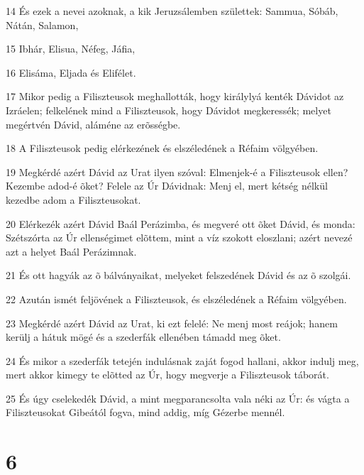 \par 14 És ezek a nevei azoknak, a kik Jeruzsálemben születtek: Sammua, Sóbáb, Nátán, Salamon,
\par 15 Ibhár, Elisua, Néfeg, Jáfia,
\par 16 Elisáma, Eljada és Elifélet.
\par 17 Mikor pedig a Filiszteusok meghallották, hogy királylyá kenték Dávidot az Izráelen; felkelének mind a Filiszteusok, hogy Dávidot megkeressék; melyet megértvén Dávid, aláméne az erõsségbe.
\par 18 A Filiszteusok pedig elérkezének és elszéledének a Réfaim völgyében.
\par 19 Megkérdé azért Dávid az Urat ilyen szóval: Elmenjek-é a Filiszteusok ellen? Kezembe adod-é õket? Felele az Úr Dávidnak: Menj el, mert kétség nélkül kezedbe adom a Filiszteusokat.
\par 20 Elérkezék azért Dávid Baál Perázimba, és megveré ott õket Dávid, és monda: Szétszórta az Úr ellenségimet elõttem, mint a víz szokott eloszlani; azért nevezé azt a helyet Baál Perázimnak.
\par 21 És ott hagyák az õ bálványaikat, melyeket felszedének Dávid és az õ szolgái.
\par 22 Azután ismét feljövének a Filiszteusok, és elszéledének a Réfaim völgyében.
\par 23 Megkérdé azért Dávid az Urat, ki ezt felelé: Ne menj most reájok; hanem kerülj a hátuk mögé és a szederfák ellenében támadd meg õket.
\par 24 És mikor a szederfák tetején indulásnak zaját fogod hallani, akkor indulj meg, mert akkor kimegy te elõtted az Úr, hogy megverje a Filiszteusok táborát.
\par 25 És úgy cselekedék Dávid, a mint megparancsolta vala néki az Úr: és vágta a Filiszteusokat Gibeától fogva, mind addig, míg  Gézerbe mennél.

\chapter{6}

